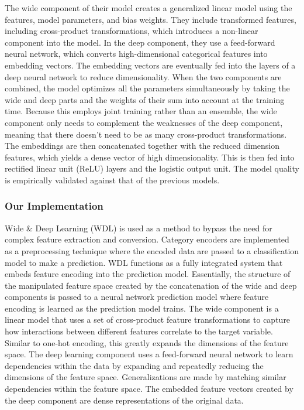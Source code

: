 \documentclass[12pt,letterpaper]{article}
\theoremstyle{plain}
\theoremstyle{definition}
\begin{document}
The wide component of their model creates a generalized linear model using the features, model parameters, and bias weights. They include transformed features, including cross-product transformations, which introduces a non-linear component into the model. In the deep component, they use a feed-forward neural network, which converts high-dimensional categorical features into embedding vectors. The embedding vectors are eventually fed into the layers of a deep neural network to reduce dimensionality. When the two components are combined, the model optimizes all the parameters simultaneously by taking the wide and deep parts and the weights of their sum into account at the training time. Because this employs joint training rather than an ensemble, the wide component only needs to complement the weaknesses of the deep component, meaning that there doesn't need to be as many cross-product transformations. 
The embeddings are then concatenated together with the reduced dimension features, which yields a dense vector of high dimensionality. This is then fed into rectified linear unit (ReLU) layers and the logistic output unit. The model quality is empirically validated against that of the previous models. 

\subsubsection{Our Implementation}
\hspace{\parindent}Wide \& Deep Learning (WDL) is used as a method to bypass the need for complex feature extraction and conversion. Category encoders are implemented as a preprocessing technique where the encoded data are passed to a classification model to make a prediction. WDL functions as a fully integrated system that embeds feature encoding into the prediction model. Essentially, the structure of the manipulated feature space created by the concatenation of the wide and deep components is passed to a neural network prediction model where feature encoding is learned as the prediction model trains. The wide component is a linear model that uses a set of cross-product feature transformations to capture how interactions between different features correlate to the target variable. Similar to one-hot encoding, this greatly expands the dimensions of the feature space. The deep learning component uses a feed-forward neural network to learn dependencies within the data by expanding and repeatedly reducing the dimensions of the feature space. Generalizations are made by matching similar dependencies within the feature space. The embedded feature vectors created by the deep component are dense representations of the original data. 
\end{document}
